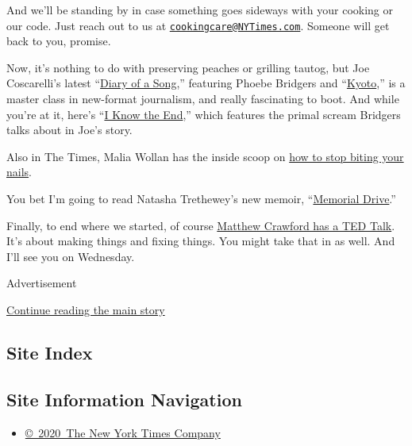 And we'll be standing by in case something goes sideways with your
cooking or our code. Just reach out to us at
\href{mailto:cookingcare@NYTimes.com}{\nolinkurl{cookingcare@NYTimes.com}}.
Someone will get back to you, promise.

Now, it's nothing to do with preserving peaches or grilling tautog, but
Joe Coscarelli's latest
``\href{https://www.nytimes3xbfgragh.onion/2020/07/30/arts/music/phoebe-bridgers-kyoto.html}{Diary
of a Song},'' featuring Phoebe Bridgers and
``\href{https://www.youtube.com/watch?v=Tw0zYd0eIlk}{Kyoto},'' is a
master class in new-format journalism, and really fascinating to boot.
And while you're at it, here's
``\href{https://www.youtube.com/watch?v=WJ9-xN6dCW4}{I Know the End},''
which features the primal scream Bridgers talks about in Joe's story.

Also in The Times, Malia Wollan has the inside scoop on
\href{https://www.nytimes3xbfgragh.onion/2020/07/28/magazine/how-to-stop-biting-your-nails.html}{how
to stop biting your nails}.

You bet I'm going to read Natasha Trethewey's new memoir,
``\href{https://www.nytimes3xbfgragh.onion/2020/07/27/books/review-memorial-drive-memoir-natasha-trethewey.html}{Memorial
Drive}.''

Finally, to end where we started, of course
\href{https://www.youtube.com/watch?v=xdGky1JZovg}{Matthew Crawford has
a TED Talk}. It's about making things and fixing things. You might take
that in as well. And I'll see you on Wednesday.

Advertisement

\protect\hyperlink{after-bottom}{Continue reading the main story}

\hypertarget{site-index}{%
\subsection{Site Index}\label{site-index}}

\hypertarget{site-information-navigation}{%
\subsection{Site Information
Navigation}\label{site-information-navigation}}

\begin{itemize}
\tightlist
\item
  \href{https://help.nytimes3xbfgragh.onion/hc/en-us/articles/115014792127-Copyright-notice}{©~2020~The
  New York Times Company}
\end{itemize}

